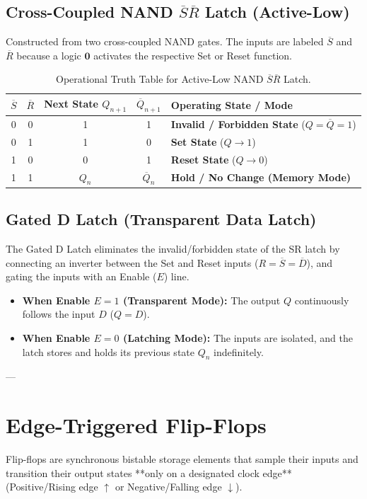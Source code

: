 \subsection{Cross-Coupled NAND \texorpdfstring{$\overline{S}\overline{R}$}{S-bar R-bar} Latch (Active-Low)}
Constructed from two cross-coupled NAND gates. The inputs are labeled $\overline{S}$ and $\overline{R}$ because a logic $\mathbf{0}$ activates the respective Set or Reset function.

\begin{table}[htbp]
\centering
\small
\begin{tabular}{cc|cc|l}
\toprule
\textbf{$\overline{S}$} & \textbf{$\overline{R}$} & \textbf{Next State $Q_{n+1}$} & \textbf{$\overline{Q}_{n+1}$} & \textbf{Operating State / Mode} \\
\midrule
0 & 0 & 1 & 1 & \textbf{Invalid / Forbidden State} ($Q = \overline{Q} = 1$) \\
0 & 1 & 1 & 0 & \textbf{Set State} ($Q \rightarrow 1$) \\
1 & 0 & 0 & 1 & \textbf{Reset State} ($Q \rightarrow 0$) \\
1 & 1 & $Q_n$ & $\overline{Q}_n$ & \textbf{Hold / No Change (Memory Mode)} \\
\bottomrule
\end{tabular}
\caption{Operational Truth Table for Active-Low NAND $\overline{S}\overline{R}$ Latch.}
\label{tab:nand-sr-latch}
\end{table}

\subsection{Gated D Latch (Transparent Data Latch)}
The Gated D Latch eliminates the invalid/forbidden state of the SR latch by connecting an inverter between the Set and Reset inputs ($R = \overline{S} = \overline{D}$), and gating the inputs with an Enable ($E$) line.

\begin{itemize}
    \item \textbf{When Enable $E = 1$ (Transparent Mode):} The output $Q$ continuously follows the input $D$ ($Q = D$).
    \item \textbf{When Enable $E = 0$ (Latching Mode):} The inputs are isolated, and the latch stores and holds its previous state $Q_n$ indefinitely.
\end{itemize}

---

\section{Edge-Triggered Flip-Flops}
Flip-flops are synchronous bistable storage elements that sample their inputs and transition their output states **only on a designated clock edge** (Positive/Rising edge $\uparrow$ or Negative/Falling edge $\downarrow$).

